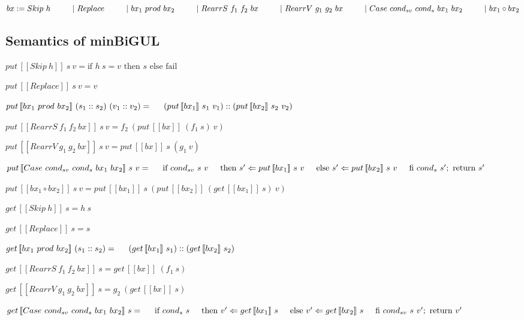 \documentclass[runningheads]{llncs}
\newcommand{\tab}{\hspace*{5mm}}
\newcommand{\qtab}{\hspace*{5mm} \ \quad}
\newcommand{\sif}[3]{\text{if } #1 \text{ then } #2 \text{ else } #3}
\newcommand{\product}[2]{#1 \ prod \ #2}
\newcommand{\rearrs}[3]{RearrS \ #1 \ #2 \ #3}
\newcommand{\rearrv}[3]{RearrV \ #1 \ #2 \ #3}
\newcommand{\casebx}[4]{Case \ #1 \ #2 \ #3 \ #4}
\newcommand{\putbx}[3]{put \, [\![#1]\!] \ #2 \ #3}
\newcommand{\getbx}[2]{get \, [\![#1]\!] \ #2}
\begin{document}
$bx := Skip \ h \\ 
    \qtab | \ Replace \\ 
    \qtab | \ bx_1 \ prod \ bx_2 \ \\ 
    \qtab | \ RearrS \ f_1 \ f_2 \ bx \\
    \qtab | \ RearrV \ g_1 \ g_2 \ bx \\
    \qtab | \ Case \ cond_{sv} \ cond_{s} \ bx_1 \ bx_2 \\ 
    \qtab | \ bx_1 \circ bx_2$

\subsection{Semantics of minBiGUL}

$\putbx{Skip \ h}{s}{v} = \sif{h \ s = v}{s}{\text{fail}}$

$\putbx{Replace}{s}{v} = v$

$\putbx{\product{bx_1}{bx_2}}{(s_1 :: s_2)}{(v_1 :: v_2)} =\\
    \tab (\putbx{bx_1}{s_1}{v_1}) :: (\putbx{bx_2}{s_2}{v_2})$

$\putbx{\rearrs{f_1}{f_2}{bx}}{s}{v} = f_2 \ (\putbx{bx}{(f_1 \ s)}{v})$

$\putbx{\rearrv{g_1}{g_2}{bx}}{s}{v} = \putbx{bx}{s}{(g_1 \ v)}$

$\putbx{\casebx{cond_{sv}}{cond_{s}}{bx_1}{bx_2}}{s}{v} = \\
    \tab \text{if} \ {cond_{sv} \ s \ v} \\
    \tab \text{then} \ s' \Leftarrow \putbx{bx_1}{s}{v} \\
    \tab \text{else} \ s' \Leftarrow \putbx{bx_2}{s}{v} \\
    \tab \text{fi} \ cond_{s} \ s'; \ \text{return} \ s'$

$\putbx{bx_1 \circ bx_2}{s}{v} = \putbx{bx_1}{s}{(\putbx{bx_2}{(\getbx{bx_1}{s})}{v})}$

\vspace{5mm}

$\getbx{Skip \ h}{s} = h \ s$

$\getbx{Replace}{s} = s$

$\getbx{\product{bx_1}{bx_2}}{(s_1 :: s_2)} = \\
    \tab (\getbx{bx_1}{s_1}) :: (\getbx{bx_2}{s_2})$

$\getbx{\rearrs{f_1}{f_2}{bx}}{s} = \getbx{bx}{(f_1 \ s)}$

$\getbx{\rearrv{g_1}{g_2}{bx}}{s} = g_2 \ (\getbx{bx}{s})$

$\getbx{\casebx{cond_{sv}}{cond_{s}}{bx_1}{bx_2}}{s} =\\
    \tab \text{if} \ {cond_{s} \ s}\\
    \tab \text{then} \ v' \Leftarrow \getbx{bx_1}{s}\\
    \tab \text{else} \ v' \Leftarrow \getbx{bx_2}{s}\\
    \tab \text{fi} \ {cond_{sv} \ s \ v'}; \ \text{return} \ v'$
\end{document}

